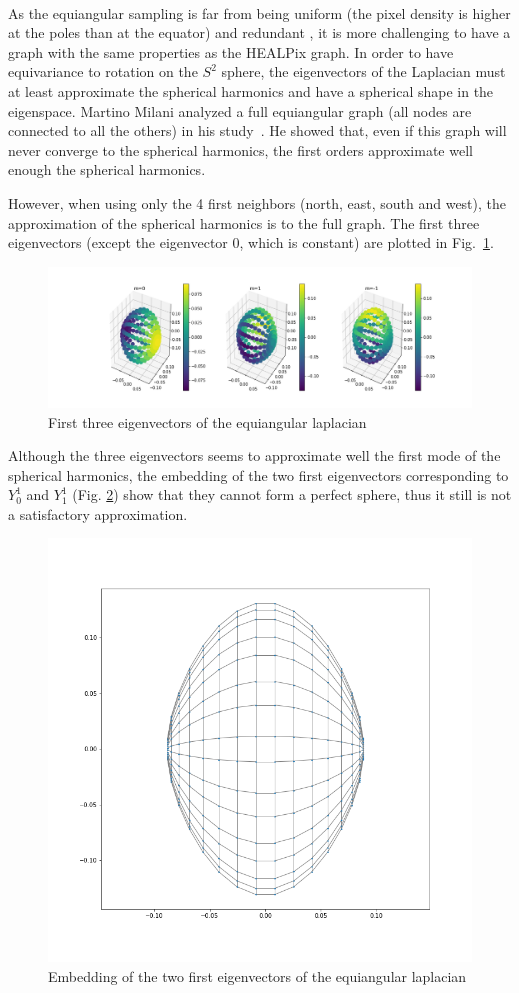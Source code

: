 \documentclass[11pt]{report}
\begin{document}
\paragraph*{}
As the equiangular sampling is far from being uniform (the pixel density is higher at the poles than at the equator) and redundant \cite{elahi_comparative_2016}, it is more challenging to have a graph with the same properties as the HEALPix graph. In order to have equivariance to rotation on the $S^2$ sphere, the eigenvectors of the Laplacian must at least approximate the spherical harmonics and have a spherical shape in the eigenspace. Martino Milani analyzed a full equiangular graph (all nodes are connected to all the others) in his study~\cite{milani_about_nodate}. He showed that, even if this graph will never converge to the spherical harmonics, the first orders approximate well enough the spherical harmonics.

However, when using only the 4 first neighbors (north, east, south and west), the approximation of the spherical harmonics is to the full graph. The first three eigenvectors (except the eigenvector 0, which is constant) are plotted in Fig.~\ref{fig:equiangular_graph}.
\clearpage
\begin{figure}[!ht]
    \centering
    \includegraphics[width=0.99\linewidth]{equi_sh.png}
    \caption{First three eigenvectors of the equiangular laplacian}
    \label{fig:equiangular_graph}
\end{figure}

Although the three eigenvectors seems to approximate well the first mode of the spherical harmonics, the embedding of the two first eigenvectors corresponding to $Y^1_0$ and $Y^1_1$ (Fig. \ref{fig:equiangular_emb_SH}) show that they cannot form a perfect sphere, thus it still is not a satisfactory approximation.

\begin{figure}[!ht]
    \centering
    \includegraphics[width=0.5\linewidth]{figures/equi_embeded_1sh.png}
    \caption{Embedding of the two first eigenvectors of the equiangular laplacian}
    \label{fig:equiangular_emb_SH}
\end{figure}
\end{document}
